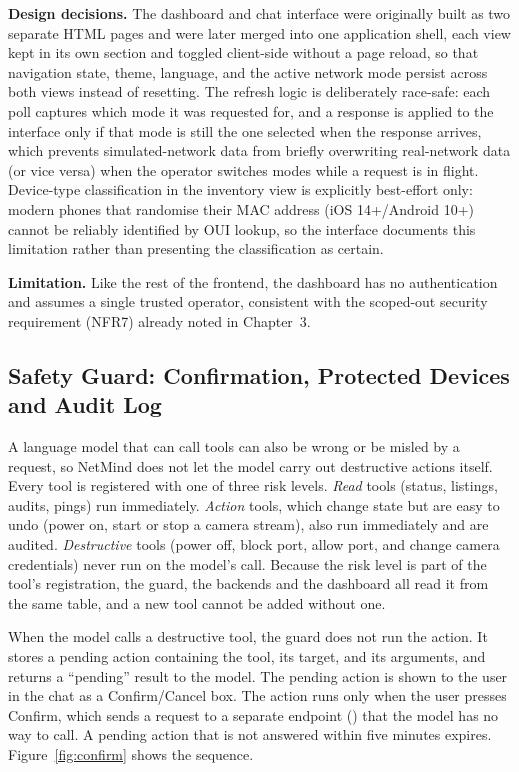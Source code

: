 \textbf{Design decisions.} The dashboard and chat interface were originally
built as two separate HTML pages and were later merged into one application
shell, each view kept in its own section and toggled client-side without a
page reload, so that navigation state, theme, language, and the active
network mode persist across both views instead of resetting. The refresh
logic is deliberately race-safe: each poll captures which mode it was
requested for, and a response is applied to the interface only if that mode
is still the one selected when the response arrives, which prevents
simulated-network data from briefly overwriting real-network data (or vice
versa) when the operator switches modes while a request is in flight.
Device-type classification in the inventory view is explicitly best-effort
only: modern phones that randomise their MAC address (iOS 14+/Android 10+)
cannot be reliably identified by OUI lookup, so the interface documents this
limitation rather than presenting the classification as certain.

\textbf{Limitation.} Like the rest of the frontend, the dashboard has no
authentication and assumes a single trusted operator, consistent with the
scoped-out security requirement (NFR7) already noted in Chapter~3.

\subsection{Safety Guard: Confirmation, Protected Devices and Audit Log}
\label{sec:guard}

A language model that can call tools can also be wrong or be misled by a
request, so NetMind does not let the model carry out destructive actions
itself. Every tool is registered with one of three risk levels. \emph{Read}
tools (status, listings, audits, pings) run immediately. \emph{Action} tools,
which change state but are easy to undo (power on, start or stop a camera
stream), also run immediately and are audited. \emph{Destructive} tools
(power off, block port, allow port, and change camera credentials) never run
on the model's call. Because the risk level is part of the tool's
registration, the guard, the backends and the dashboard all read it from the
same table, and a new tool cannot be added without one.

When the model calls a destructive tool, the guard does not run the action.
It stores a pending action containing the tool, its target, and its
arguments, and returns a ``pending'' result to the model. The pending action
is shown to the user in the chat as a Confirm/Cancel box. The action runs only
when the user presses Confirm, which sends a request to a separate endpoint
() that the model has no way to call. A pending action
that is not answered within five minutes expires.
Figure~\ref{fig:confirm} shows the sequence.

